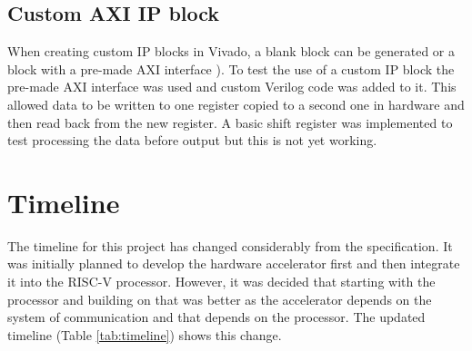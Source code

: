 \subsection{Custom AXI IP block}
When creating custom IP blocks in Vivado, a blank block can be generated or a block with a pre-made AXI interface \cite{xilinx_axiip}). To test the use of a custom IP block the pre-made AXI interface was used and custom Verilog code was added to it. This allowed data to be written to one register copied to a second one in hardware and then read back from the new register. A basic shift register was implemented to test processing the data before output but this is not yet working.

\section{Timeline}
The timeline for this project has changed considerably from the specification. It was initially planned to develop the hardware accelerator first and then integrate it into the RISC-V processor. However, it was decided that starting with the processor and building on that was better as the accelerator depends on the system of communication and that depends on the processor. The updated timeline (Table \ref{tab:timeline}) shows this change.

